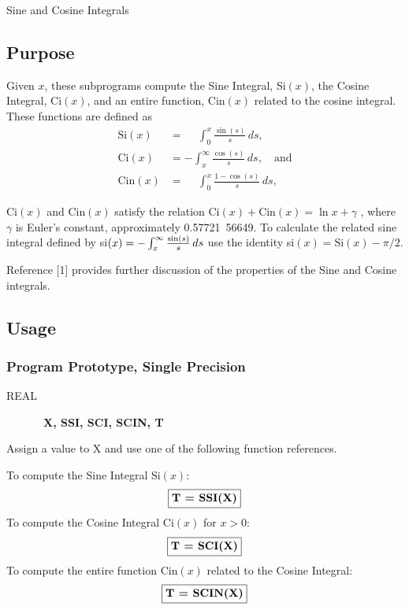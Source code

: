 \documentclass[twoside]{MATH77}
\begin{document}
 Sine and Cosine Integrals


\subsection{Purpose}

Given $x$, these subprograms compute the Sine Integral, Si$(x)$, the Cosine
Integral, Ci$(x)$, and an entire function, Cin$(x)$ related to the cosine
integral. These functions are defined as%
\begin{align*}
\text{Si}(x)&=\phantom{-}\int_0^x\frac{\sin (s)}s\,ds,\\
\text{Ci}(x)&=-\int_x^\infty \frac{\cos (s)}s\,ds,\quad \text{and}\\
\text{Cin}(x)&=\phantom{-}\int_0^x\frac{1-\cos (s)}s\,ds,
\end{align*}

Ci$(x)$ and Cin$(x)$ satisfy the relation Ci$(x)+\text{Cin}(x)=\ln x+\gamma $%
, where $\gamma $ is Euler's constant, approximately 0.57721~56649. To
calculate the related sine integral defined by si$(x)=-\int_x^\infty \frac{%
\sin (s)}s\,ds$ use the identity si$(x)=\text{Si}(x)-\pi /2.$

Reference [1] provides further discussion of the properties of the Sine and
Cosine integrals.

\subsection{Usage}

\subsubsection{Program Prototype, Single Precision}

\begin{description}
\item[REAL]  \ {\bf X, SSI, SCI, SCIN, T}
\end{description}

Assign a value to X and use one of the following function references.

To compute the Sine Integral Si$(x):$
$$
\fbox{{\bf T = SSI(X)}}
$$
To compute the Cosine Integral Ci$(x)$ for $x > 0:$
$$
\fbox{{\bf T = SCI(X)}}
$$
To compute the entire function Cin$(x)$ related to the Cosine Integral:
$$
\fbox{{\bf T = SCIN(X)}}
$$
\end{document}
